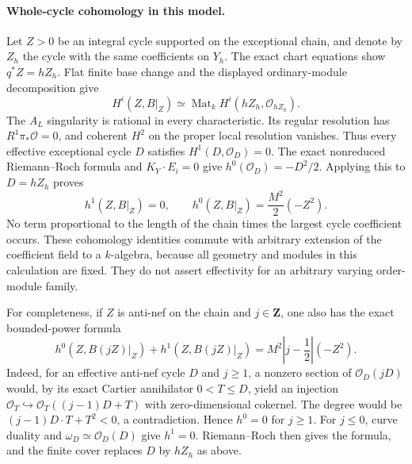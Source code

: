 \paragraph{Whole-cycle cohomology in this model.}
Let $Z>0$ be an integral cycle supported on the exceptional chain,
and denote by $Z_h$ the cycle with the same coefficients on $Y_h$.
The exact chart equations show $q^*Z=hZ_h$. Flat finite base change
and the displayed ordinary-module decomposition give
\[
 H^i(Z,B|_Z)\simeq
 \operatorname{Mat}_k H^i(hZ_h,\mathcal O_{hZ_h}).
\]
The $A_L$ singularity is rational in every characteristic. Its
regular resolution has $R^1\pi_*\mathcal O=0$, and coherent $H^2$
on the proper local resolution vanishes. Thus every effective
exceptional cycle $D$ satisfies $H^1(D,\mathcal O_D)=0$. The exact
nonreduced Riemann--Roch formula and $K_Y\cdot E_i=0$ give
$h^0(\mathcal O_D)=-D^2/2$. Applying this to $D=hZ_h$ proves
\[
       h^1(Z,B|_Z)=0,\qquad
       h^0(Z,B|_Z)=\frac{M^2}{2}(-Z^2).
\]
No term proportional to the length of the chain times the largest
cycle coefficient occurs. These cohomology identities commute with
arbitrary extension of the coefficient field to a $k$-algebra,
because all geometry and modules in this calculation are fixed.
They do not assert effectivity for an arbitrary varying order-module
family.

For completeness, if $Z$ is anti-nef on the chain and $j\in\mathbf Z$,
one also has the exact bounded-power formula
\[
 h^0(Z,B(jZ)|_Z)+h^1(Z,B(jZ)|_Z)
                 =M^2\left|j-\frac12\right|(-Z^2).
\]
Indeed, for an effective anti-nef cycle $D$ and $j\ge1$, a nonzero
section of $\mathcal O_D(jD)$ would, by its exact Cartier
annihilator $0<T\le D$, yield an injection
$\mathcal O_T\hookrightarrow\mathcal O_T((j-1)D+T)$ with
zero-dimensional cokernel. The degree would be
$(j-1)D\cdot T+T^2<0$, a contradiction. Hence $h^0=0$ for
$j\ge1$. For $j\le0$, curve duality and
$\omega_D\simeq\mathcal O_D(D)$ give $h^1=0$. Riemann--Roch
then gives the formula, and the finite cover replaces $D$ by
$hZ_h$ as above.

